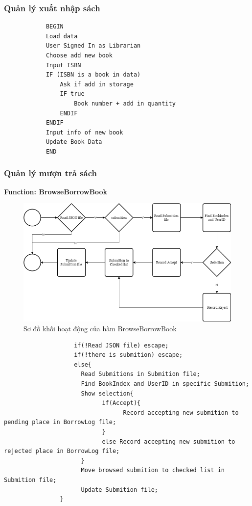 \documentclass[12pt,a4paper]{report}
\begin{document}
            \subsubsection{Quản lý xuất nhập sách}
            \begin{verbatim}
            BEGIN
            Load data
            User Signed In as Librarian
            Choose add new book
            Input ISBN
            IF (ISBN is a book in data)
                Ask if add in storage
                IF true
                    Book number + add in quantity
                ENDIF
            ENDIF
            Input info of new book
            Update Book Data
            END
            \end{verbatim}
            \subsubsection{Quản lý mượn trả sách}
                \textbf{Function: BrowseBorrowBook}
                \begin{figure}[H]
                    \centering
                    \label{F:browsebook}
                    \includegraphics[scale = .4]{browsebook.png}
                    \caption{Sơ đồ khối hoạt động của hàm BrowseBorrowBook}
                \end{figure}
                \begin{verbatim}
                    if(!Read JSON file) escape;
                    if(!there is submition) escape;
                    else{
                      Read Submitions in Submition file;
                      Find BookIndex and UserID in specific Submition;
                      Show selection{
                            if(Accept){
                                  Record accepting new submition to pending place in BorrowLog file;
                            }
                            else Record accepting new submition to rejected place in BorrowLog file;
                      }
                      Move browsed submition to checked list in Submition file;
                      Update Submition file;
                }
                \end{verbatim}
\end{document}
